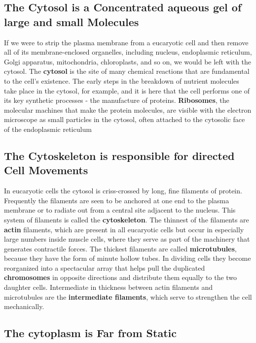\subsection{The Cytosol is a Concentrated aqueous gel of large and small Molecules}

If we were to strip the plasma membrane from a eucaryotic cell and then
remove all of its membrane-enclosed organelles, including nucleus,
endoplasmic reticulum, Golgi apparatus, mitochondria, chloroplasts, and
so on, we would be left with the cytosol. The \textbf{cytosol} is the site of many chemical
reactions that are fundamental to the cell’s existence. The early steps
in the breakdown of nutrient molecules take place in the cytosol, for
example, and it is here that the cell performs one of its key synthetic processes
- the manufacture of proteins. \textbf{Ribosomes}, the molecular machines
that make the protein molecules, are visible with the electron microscope
as small particles in the cytosol, often attached to the cytosolic face of the
endoplasmic reticulum

\subsection{The Cytoskeleton is responsible for directed Cell Movements}

In eucaryotic cells the cytosol is criss-crossed by long, fine filaments of protein. Frequently the
filaments are seen to be anchored at one end to the plasma membrane
or to radiate out from a central site adjacent to the nucleus. This system of
filaments is called the \textbf{cytoskeleton}. The thinnest
of the filaments are \textbf{actin} filaments, which are present in all eucaryotic
cells but occur in especially large numbers inside muscle cells, where
they serve as part of the machinery that generates contractile forces. The
thickest filaments are called \textbf{microtubules}, because they have the form of
minute hollow tubes. In dividing cells they become reorganized into a
spectacular array that helps pull the duplicated \textbf{chromosomes} in opposite
directions and distribute them equally to the two daughter cells.
Intermediate in thickness between actin filaments and microtubules are the
\textbf{intermediate filaments}, which serve to strengthen the cell
mechanically.

\subsection{The cytoplasm is Far from Static}

